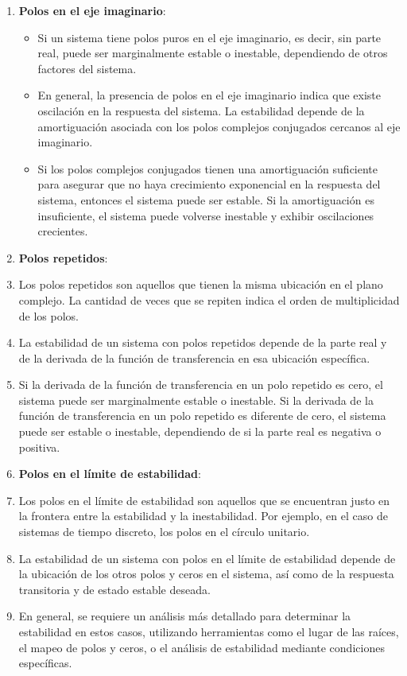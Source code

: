 \documentclass[
	12pt, %
	fleqn, %
	a4paper, %
	oneside, %
]{LegrandOrangeBook}
\begin{document}
\begin{enumerate}
\item \textbf{Polos en el eje imaginario}:
\begin{itemize}
\item Si un sistema tiene polos puros en el eje imaginario, es decir, sin parte real, puede ser marginalmente estable o inestable, dependiendo de otros factores del sistema.
\item En general, la presencia de polos en el eje imaginario indica que existe oscilación en la respuesta del sistema. La estabilidad depende de la amortiguación asociada con los polos complejos conjugados cercanos al eje imaginario.
\item Si los polos complejos conjugados tienen una amortiguación suficiente para asegurar que no haya crecimiento exponencial en la respuesta del sistema, entonces el sistema puede ser estable. Si la amortiguación es insuficiente, el sistema puede volverse inestable y exhibir oscilaciones crecientes.
\end{itemize}
\item \textbf{Polos repetidos}:
\item Los polos repetidos son aquellos que tienen la misma ubicación en el plano complejo. La cantidad de veces que se repiten indica el orden de multiplicidad de los polos.
\item La estabilidad de un sistema con polos repetidos depende de la parte real y de la derivada de la función de transferencia en esa ubicación específica.
\item Si la derivada de la función de transferencia en un polo repetido es cero, el sistema puede ser marginalmente estable o inestable.
Si la derivada de la función de transferencia en un polo repetido es diferente de cero, el sistema puede ser estable o inestable, dependiendo de si la parte real es negativa o positiva.
\item \textbf{Polos en el límite de estabilidad}:
\item Los polos en el límite de estabilidad son aquellos que se encuentran justo en la frontera entre la estabilidad y la inestabilidad. Por ejemplo, en el caso de sistemas de tiempo discreto, los polos en el círculo unitario.
\item La estabilidad de un sistema con polos en el límite de estabilidad depende de la ubicación de los otros polos y ceros en el sistema, así como de la respuesta transitoria y de estado estable deseada.
\item En general, se requiere un análisis más detallado para determinar la estabilidad en estos casos, utilizando herramientas como el lugar de las raíces, el mapeo de polos y ceros, o el análisis de estabilidad mediante condiciones específicas.
\end{enumerate}
\end{document}
